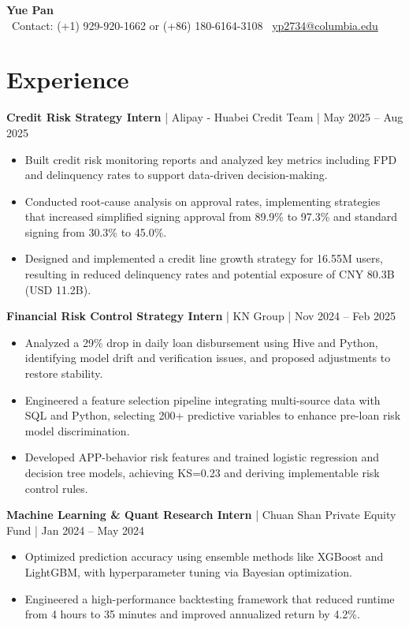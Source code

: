 \documentclass[11pt,letterpaper]{article}
\begin{document}
\begin{center}
    {\fontsize{26}{28}\selectfont \textbf{Yue Pan}} \\
    \vspace{2pt}
    \faPhone\ Contact: (+1) 929-920-1662 or (+86) 180-6164-3108 \quad \faEnvelope\ \href{mailto:yp2734@columbia.edu}{yp2734@columbia.edu}
\end{center}


\section{Experience}
\textbf{Credit Risk Strategy Intern} | Alipay - Huabei Credit Team | May 2025 – Aug 2025
\begin{itemize}[leftmargin=*, topsep=0pt, itemsep=1pt]
\item Built credit risk monitoring reports and analyzed key metrics including FPD and delinquency rates to support data-driven decision-making.
\item Conducted root-cause analysis on approval rates, implementing strategies that increased simplified signing approval from 89.9\% to 97.3\% and standard signing from 30.3\% to 45.0\%.
\item Designed and implemented a credit line growth strategy for 16.55M users, resulting in reduced delinquency rates and potential exposure of CNY 80.3B (USD 11.2B).
\end{itemize}

\textbf{Financial Risk Control Strategy Intern} | KN Group | Nov 2024 – Feb 2025
\begin{itemize}[leftmargin=*, topsep=0pt, itemsep=1pt]
\item Analyzed a 29\% drop in daily loan disbursement using Hive and Python, identifying model drift and verification issues, and proposed adjustments to restore stability.
\item Engineered a feature selection pipeline integrating multi-source data with SQL and Python, selecting 200+ predictive variables to enhance pre-loan risk model discrimination.
\item Developed APP-behavior risk features and trained logistic regression and decision tree models, achieving KS=0.23 and deriving implementable risk control rules.
\end{itemize}

\textbf{Machine Learning \& Quant Research Intern} | Chuan Shan Private Equity Fund | Jan 2024 – May 2024
\begin{itemize}[leftmargin=*, topsep=0pt, itemsep=1pt]
\item Optimized prediction accuracy using ensemble methods like XGBoost and LightGBM, with hyperparameter tuning via Bayesian optimization.
\item Engineered a high-performance backtesting framework that reduced runtime from 4 hours to 35 minutes and improved annualized return by 4.2\%.
\end{itemize}
\end{document}
